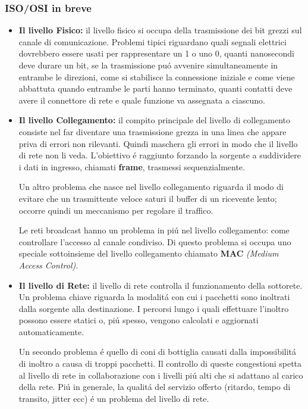 \documentclass[12pt]{article}
\begin{document}
\subsubsection{ISO/OSI in breve}\label{iso-osi-in-breve}
\begin{itemize}
	\item \textbf{Il livello Fisico:} il livello fisico si occupa della trasmissione dei bit grezzi sul canale di 
    comunicazione. Problemi tipici riguardano quali segnali elettrici dovrebbero essere usati per rappresentare un 1 o uno 
    0, quanti nanosecondi deve durare un bit, se la trasmissione pu\'o avvenire simultaneamente in entrambe le direzioni, 
    come si stabilisce la connessione iniziale e come viene abbattuta quando entrambe le parti hanno terminato, quanti contatti 
    deve avere il connettore di rete e quale funzione va assegnata a ciascuno.
    
    \item \textbf{Il livello Collegamento:} il compito principale del livello di collegamento consiste nel far diventare una 
    trasmissione grezza in una linea che appare priva di errori non rilevanti. Quindi maschera gli errori in modo che il livello 
    di rete non li veda. L'obiettivo \'e raggiunto forzando la sorgente a suddividere i dati in ingresso, chiamati \textbf{frame}, 
    trasmessi sequenzialmente. 
    
    Un altro problema che nasce nel livello collegamento riguarda il modo di evitare che un trasmittente veloce saturi il buffer 
    di un ricevente lento; occorre quindi un meccanismo per regolare il traffico. 
    
    Le reti broadcast hanno un problema in pi\'u nel livello collegamento: come controllare l'accesso al canale condiviso. Di 
    questo problema si occupa uno speciale sottoinsieme del livello collegamento chiamato \textbf{MAC} \textit{(Medium Access 
    Control)}.
    
    \item \textbf{Il livello di Rete:} il livello di rete controlla il funzionamento della sottorete. Un problema chiave riguarda
    la modalit\'a con cui i pacchetti sono inoltrati dalla sorgente alla destinazione. I percorsi lungo i quali effettuare 
    l'inoltro possono essere statici o, pi\'u spesso, vengono calcolati e aggiornati automaticamente. 
    
    Un secondo problema \'e quello di coni di bottiglia causati dalla impossibilit\'a di inoltro a causa di troppi pacchetti. Il 
    controllo di queste congestioni spetta al livello di rete in collaborazione con i livelli pi\'u alti che si adattano al carico 
    della rete. Pi\'u in generale, la qualit\'a del servizio offerto (ritardo, tempo di transito, jitter ecc) \'e un problema del 
    livello di rete. 
    

\end{itemize}
\end{document}
